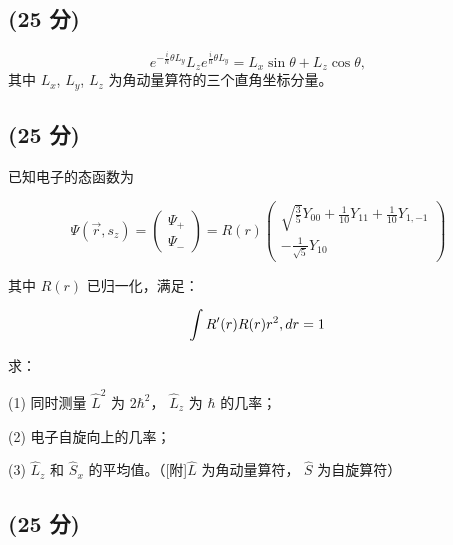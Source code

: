 \subsection{(25 分)}
\[    e^{-\frac{i}{\hbar}\theta L_y} L_z e^{\frac{i}{\hbar}\theta L_y} = L_x \sin\theta + L_z \cos\theta, ~\]
    其中 $L_x$, $L_y$, $L_z$ 为角动量算符的三个直角坐标分量。
\subsection{(25 分)}

已知电子的态函数为

\[
\Psi(\vec{r}, s_z) = \begin{pmatrix} \Psi_+ \\ \Psi_- \end{pmatrix} = R(r) \begin{pmatrix} \sqrt{\frac{3}{5}} Y_{00} + \frac{1}{10} Y_{11} + \frac{1}{10} Y_{1,-1} \\ -\frac{1}{\sqrt{5}} Y_{10} \end{pmatrix}~
\]

其中 \( R(r) \) 已归一化，满足：

\[
\int R'(r) R(r) r^2 \\, dr = 1~
\]

求：

(1) 同时测量 \( \hat{L}^2 \) 为 \( 2\hbar^2 \)， \( \hat{L}_z \) 为 \( \hbar \)  的几率；  

(2) 电子自旋向上的几率；  

(3) \( \hat{L}_z \) 和 \( \hat{S}_x \) 的平均值。（[附]\( \hat{L} \) 为角动量算符， \( \hat{S} \) 为自旋算符）
\subsection{(25 分)}
